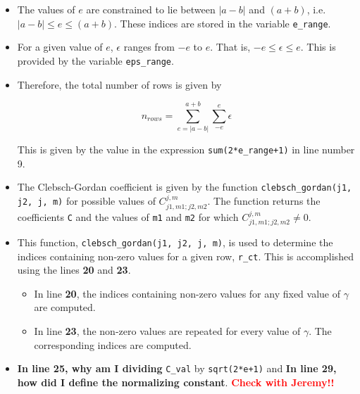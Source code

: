 \begin{itemize}

\item The values of $e$ are constrained to lie between $|a-b|$ and $(a+b)$, i.e.
  $|a-b| \leq e \leq (a+b)$. These indices are stored in the variable
  \verb|e_range|.
\item For a given value of $e$, $\epsilon$ ranges from $-e$ to $e$. That is, $-e
  \leq \epsilon \leq e$. This is provided by the variable \verb|eps_range|.
\item Therefore, the total number of rows is given by

  \begin{equation*}
    n_{rows} = \sum_{e = |a-b|}^{a+b} \sum_{-e}^{e} \epsilon
  \end{equation*}

  This is given by the value in the expression \verb|sum(2*e_range+1)| in line
  number 9.
    
\item The Clebsch-Gordan coefficient is given by the function
  \verb|clebsch_gordan(j1, j2, j, m)| for possible values of
  $C^{j,m}_{j1,m1;j2,m2}$. The function returns the coefficients \verb|C| and
  the values of \verb|m1| and \verb|m2| for which $C^{j,m}_{j1,m1;j2,m2} \neq
  0$.
    
\item This function, \verb|clebsch_gordan(j1, j2, j, m)|, is used to determine
  the indices containing non-zero values for a given row, \verb|r_ct|. This is
  accomplished using the lines \textbf{20} and \textbf{23}.
    
  \begin{itemize}
  \item In line \textbf{20}, the indices containing non-zero values for any
    fixed value of $\gamma$ are computed.
  \item In line \textbf{23}, the non-zero values are repeated for every value of
    $\gamma$. The corresponding indices are computed.
  \end{itemize}
    
\item \textbf{In line 25, why am I dividing} \verb|C_val| by \verb|sqrt(2*e+1)|
  and \textbf{In line 29, how did I define the normalizing constant}.
  \textcolor{red}{\textbf{Check with Jeremy!!}}

\end{itemize}

\clearpage
\newpage

% 

